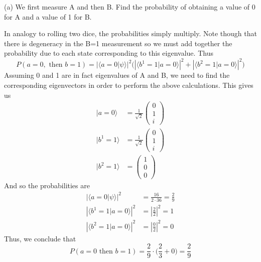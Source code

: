 \documentclass[a4paper, 11pt]{article}
\newcommand{\ket}[1]{|#1\rangle}
\newcommand{\braket}[2]{\langle #1 | #2 \rangle}
\newenvironment{solution}{%
	\begin{list}{}{%
			\setlength{\topsep}{0pt}%
			\setlength{\leftmargin}{1.5cm}%
			\setlength{\rightmargin}{1.5cm}%
			\setlength{\listparindent}{\parindent}%
			\setlength{\itemindent}{\parindent}%
			\setlength{\parsep}{\parskip}%
		}%
		\item[]}{\end{list}}
\begin{document}
\noindent (a) We first measure A and then B. Find the probability of obtaining a value of 0 for A and a value of 1 for B. \\
	\begin{solution}
		\noindent In analogy to rolling two dice, the probabilities simply multiply. Note though that there is degeneracy in the B=1 measurement so we must add together the probability due to each state corresponding to this eigenvalue. Thus 
			\begin{equation*}
				P(a=0, \text{ then } b=1) = \left|\braket{a=0}{\psi}\right|^2  \Bigg( \left|\braket{b^1=1}{a=0}\right|^2+\left|\braket{b^2=1}{a=0}\right|^2 \Bigg)
			\end{equation*}
		Assuming 0 and 1 are in fact eigenvalues of A and B, we need to find the corresponding eigenvectors in order to perform the above calculations. This gives us
			\begin{align*}
				\ket{a=0} &= \frac{1}{\sqrt{2}}\begin{pmatrix} 0 \\ 1 \\ i\end{pmatrix} \\ 
				\ket{b^1=1} &= \frac{1}{\sqrt{2}}\begin{pmatrix} 0 \\ 1 \\ i\end{pmatrix}\\
				\ket{b^2=1} &= \begin{pmatrix} 1 \\ 0 \\ 0\end{pmatrix}
			\end{align*}
		And so the probabilities are
			\begin{align*}
				\left|\braket{a=0}{\psi}\right|^2 &= \frac{16}{2\cdot 36} = \frac{2}{9} \\ 
				\left| \braket{b^1=1}{a=0} \right|^2 &= \left|\frac{2}{2}\right|^2 = 1 \\ 
				\left| \braket{b^2=1}{a=0} \right|^2 &= \left|\frac{0}{2}\right|^2= 0
			\end{align*}
		Thus, we conclude that
			\begin{equation*}
				P\left( a=0 \text{ then } b=1 \right) = \frac{2}{9}\cdot \Big(\frac{2}{3}  + 0\Big) = \frac{2}{9}
			\end{equation*}
	\end{solution}
\end{document}
